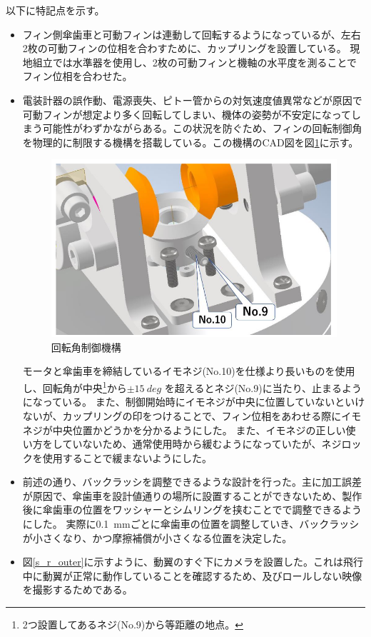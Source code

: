 \documentclass[a4paper,11pt,titlepage,uplatex]{jsarticle}
\begin{document}
以下に特記点を示す。
\begin{itemize}
    \item フィン側傘歯車と可動フィンは連動して回転するようになっているが、左右2枚の可動フィンの位相を合わすために、カップリングを設置している。
          現地組立では水準器を使用し、2枚の可動フィンと機軸の水平度を測ることでフィン位相を合わせた。
          \\
    \item 電装計器の誤作動、電源喪失、ピトー管からの対気速度値異常などが原因で可動フィンが想定より多く回転してしまい、機体の姿勢が不安定になってしまう可能性がわずかながらある。この状況を防ぐため、フィンの回転制御角を物理的に制限する機構を搭載している。この機構のCAD図を図\ref{s_r_kadouiki}に示す。
          \begin{figure}[H]
              \centering
              \includegraphics[scale = 0.5]{pic_str/s_r_kadouiki.png}
              \caption{回転角制御機構}
              \label{s_r_kadouiki}
          \end{figure}
          モータと傘歯車を締結しているイモネジ(No.10)を仕様より長いものを使用し、回転角が中央\footnote{2つ設置してあるネジ(No.9)から等距離の地点。}から$\pm \SI{15}{deg}$ を超えるとネジ(No.9)に当たり、止まるようになっている。
          また、制御開始時にイモネジが中央に位置していないといけないが、カップリングの印をつけることで、フィン位相をあわせる際にイモネジが中央位置かどうかを分かるようにした。
          また、イモネジの正しい使い方をしていないため、通常使用時から緩むようになっていたが、ネジロックを使用することで緩まないようにした。
          \\
    \item 前述の通り、バックラッシを調整できるような設計を行った。主に加工誤差が原因で、傘歯車を設計値通りの場所に設置することができないため、製作後に傘歯車の位置をワッシャーとシムリングを挟むことでで調整できるようにした。
          実際に\SI{0.1}{mm}ごとに傘歯車の位置を調整していき、バックラッシが小さくなり、かつ摩擦補償が小さくなる位置を決定した。
          \\
    \item 図\ref{s_r_outer}に示すように、動翼のすぐ下にカメラを設置した。これは飛行中に動翼が正常に動作していることを確認するため、及びロールしない映像を撮影するためである。
\end{itemize}
\end{document}
